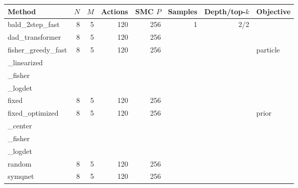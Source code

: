 \begin{tabular}{lrrrrrrl}
\toprule
Method & $N$ & $M$ & Actions & SMC $P$ & Samples & Depth/top-$k$ & Objective \\
\midrule
bald\_2step\_fast & 8 & 5 & 120 & 256 & 1 & 2/2 &  \\
dad\_transformer & 8 & 5 & 120 & 256 &  &  &  \\
fisher\_greedy\_fast & 8 & 5 & 120 & 256 &  &  & particle\\_linearized\\_fisher\\_logdet \\
fixed & 8 & 5 & 120 & 256 &  &  &  \\
fixed\_optimized & 8 & 5 & 120 & 256 &  &  & prior\\_center\\_fisher\\_logdet \\
random & 8 & 5 & 120 & 256 &  &  &  \\
symqnet & 8 & 5 & 120 & 256 &  &  &  \\
\bottomrule
\end{tabular}
